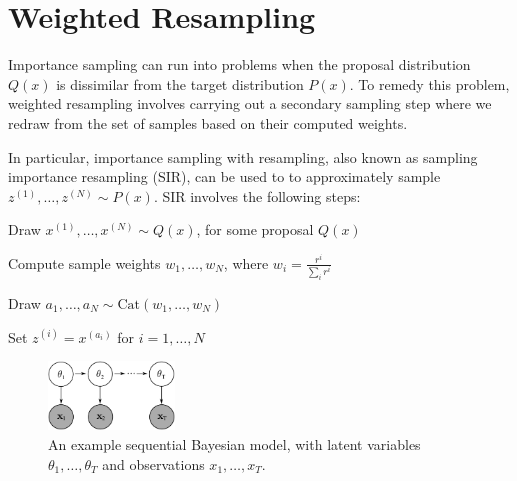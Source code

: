 \documentclass[twoside]{article}
\begin{document}
\section{Weighted Resampling}
Importance sampling can run into problems when the proposal distribution $Q(x)$ is dissimilar from the target distribution $P(x)$. To remedy this problem, weighted resampling involves carrying out a secondary sampling step where we redraw from the set of samples based on their computed weights.

In particular, importance sampling with resampling, also known as sampling importance resampling (SIR), can be used to to approximately sample $z^{(1)},\ldots,z^{(N)} \sim P(x)$. SIR involves the following steps:
\begin{enumerate*}
    \item Draw $x^{(1)},\ldots,x^{(N)} \sim Q(x)$, for some proposal $Q(x)$
    \item Compute sample weights $w_1,\ldots,w_N$, where $w_i = \frac{r^i}{\sum_i r^i}$
    \item Draw $a_1,\ldots,a_N \sim \text{Cat}(w_1,\ldots,w_N)$ 
    \item Set $z^{(i)} = x^{(a_i)}$ for $i = 1,\ldots,N$
\end{enumerate*}

\begin{figure}[!tbp]
  \centering
  \includegraphics[width=0.3\textwidth]{dynamicBayesNet.pdf}
  \caption{An example sequential Bayesian model, with latent variables $\theta_1,\ldots,\theta_T$ and observations $x_1,\ldots,x_T$.}
  \label{fig:dynamicBayesNet}
\end{figure}
\end{document}
